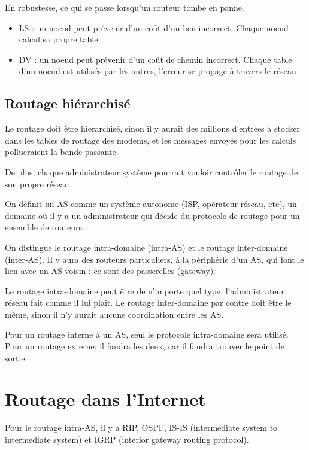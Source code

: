 	En robustesse, ce qui se passe lorsqu'un routeur tombe en panne.
	
	\begin{itemize}
		\item LS : un noeud peut prévenir d'un coût d'un lien incorrect. Chaque noeud calcul sa propre table
		\item DV : un noeud peut prévenir d'un coût de chemin incorrect. Chaque table d'un noeud est utilisés par les autres, l'erreur se propage à travers le réseau
	\end{itemize}
	
	\subsection{Routage hiérarchisé}
	
	Le routage doit être hiérarchisé, sinon il y aurait des millions d'entrées à stocker dans les tables de routage des modems, et les messages envoyés pour les calculs pollueraient la bande passante.
	
	De plus, chaque administrateur système pourrait vouloir contrôler le routage de son propre réseau
	
	On définit un AS comme un système autonome (ISP, opérateur réseau, etc), un domaine où il y a un administrateur qui décide du protocole de routage pour un ensemble de routeurs.
	
	
	On distingue le routage intra-domaine (intra-AS) et le routage inter-domaine (inter-AS). Il y aura des routeurs particuliers, à la périphérie d'un AS, qui font le lien avec un AS voisin : ce sont des passerelles (gateway).
	
	Le routage intra-domaine peut être de n'importe quel type, l'administrateur réseau fait comme il lui plaît. Le routage inter-domaine par contre doit être le même, sinon il n'y aurait aucune coordination entre les AS.
	
	Pour un routage interne à un AS, seul le protocole intra-domaine sera utilisé. Pour un routage externe, il faudra les deux, car il faudra trouver le point de sortie.
	

\section{Routage dans l'Internet}

Pour le routage intra-AS, il y a RIP, OSPF, IS-IS (intermediate system to intermediate system) et IGRP (interior gateway routing protocol).

